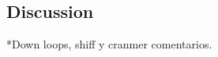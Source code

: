 \documentclass[namedreferences]{solarphysics}
\begin{document}
\begin{article}
\section{Discussion}\label{discu} 

*Down loops, shiff y cranmer comentarios.




%



%
  

%



%
%


%
%

  
%
%
%   
%  

\end{article} 
\end{document}
